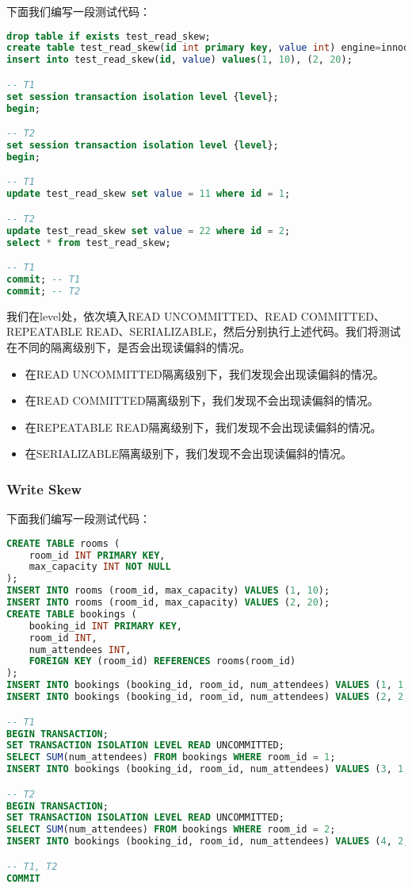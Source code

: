 \documentclass{article}
\begin{document}
下面我们编写一段测试代码：

\begin{lstlisting}[language=sql]
drop table if exists test_read_skew;
create table test_read_skew(id int primary key, value int) engine=innodb;
insert into test_read_skew(id, value) values(1, 10), (2, 20);

-- T1
set session transaction isolation level {level};
begin;

-- T2
set session transaction isolation level {level};
begin;

-- T1 
update test_read_skew set value = 11 where id = 1;

-- T2 
update test_read_skew set value = 22 where id = 2;
select * from test_read_skew;

-- T1
commit; -- T1
commit; -- T2
\end{lstlisting}

我们在{level}处，依次填入READ UNCOMMITTED、READ COMMITTED、REPEATABLE READ、SERIALIZABLE，然后分别执行上述代码。我们将测试在不同的隔离级别下，是否会出现读偏斜的情况。

\begin{itemize}
    \item 在READ UNCOMMITTED隔离级别下，我们发现会出现读偏斜的情况。
    \item 在READ COMMITTED隔离级别下，我们发现不会出现读偏斜的情况。
    \item 在REPEATABLE READ隔离级别下，我们发现不会出现读偏斜的情况。
    \item 在SERIALIZABLE隔离级别下，我们发现不会出现读偏斜的情况。
\end{itemize}

\subsubsection{Write Skew}

下面我们编写一段测试代码：

\begin{lstlisting}[language=sql]
CREATE TABLE rooms (
    room_id INT PRIMARY KEY,
    max_capacity INT NOT NULL
);
INSERT INTO rooms (room_id, max_capacity) VALUES (1, 10);
INSERT INTO rooms (room_id, max_capacity) VALUES (2, 20);
CREATE TABLE bookings (
    booking_id INT PRIMARY KEY,
    room_id INT,
    num_attendees INT,
    FOREIGN KEY (room_id) REFERENCES rooms(room_id)
);
INSERT INTO bookings (booking_id, room_id, num_attendees) VALUES (1, 1, 5);
INSERT INTO bookings (booking_id, room_id, num_attendees) VALUES (2, 2, 10);

-- T1
BEGIN TRANSACTION;
SET TRANSACTION ISOLATION LEVEL READ UNCOMMITTED;
SELECT SUM(num_attendees) FROM bookings WHERE room_id = 1;
INSERT INTO bookings (booking_id, room_id, num_attendees) VALUES (3, 1, 5);

-- T2
BEGIN TRANSACTION;
SET TRANSACTION ISOLATION LEVEL READ UNCOMMITTED;
SELECT SUM(num_attendees) FROM bookings WHERE room_id = 2;
INSERT INTO bookings (booking_id, room_id, num_attendees) VALUES (4, 2, 15);

-- T1, T2
COMMIT
\end{lstlisting}
\end{document}
